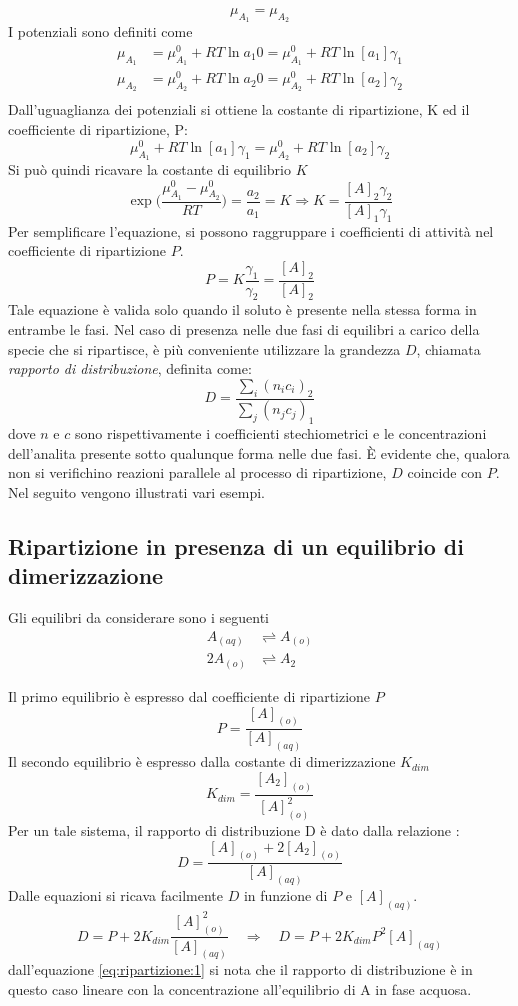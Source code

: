 \[
\mu_{A_{1}} = \mu_{A_{2}}
\]
I potenziali sono definiti come
\begin{align*}
\mu_{A_{1}} & = \mu_{A_{1}}^0 + RT \ln a_1 0 = \mu_{A_{1}}^0 + RT \ln [a_1]\gamma_1\\
\mu_{A_{2}} & = \mu_{A_{2}}^0 + RT \ln a_2 0 = \mu_{A_{2}}^0 + RT \ln [a_2]\gamma_2\\
\end{align*}
Dall'uguaglianza dei potenziali si ottiene la costante di ripartizione, K ed il coefficiente di ripartizione, P:
\[
\mu_{A_{1}}^0 + RT \ln [a_1]\gamma_1 = \mu_{A_{2}}^0 + RT \ln [a_2]\gamma_2
\]
Si può quindi ricavare la costante di equilibrio $K$
\[
\exp{\biggl(\frac{\mu_{A_{1}}^0 - \mu_{A_{2}}^0}{RT}\biggr)} = \frac{a_2}{a_1} = K \Rightarrow K = \frac{[A]_2 \gamma_2}{[A]_1 \gamma_1}
\]
Per semplificare l'equazione, si possono raggruppare i coefficienti di attività nel coefficiente di ripartizione $P$.
\[
P = K\frac{\gamma_1}{\gamma_2} = \frac{[A]_2}{[A]_2}
\]
Tale equazione è valida solo quando il soluto è presente nella stessa forma in entrambe le fasi. Nel caso di presenza nelle due fasi di equilibri a carico della specie che si ripartisce, è più conveniente utilizzare la grandezza $D$, chiamata \emph{rapporto di distribuzione}, definita come:
\[
D = \frac{\sum_i (n_i c_i)_2}{\sum_j (n_j c_j)_1}
\]
dove $n$ e $c$ sono rispettivamente i coefficienti stechiometrici e le concentrazioni dell'analita presente sotto qualunque forma nelle due fasi. È evidente che, qualora non si verifichino reazioni parallele al processo di ripartizione, $D$ coincide con $P$. Nel seguito vengono illustrati vari esempi.

\subsection{Ripartizione in presenza di un equilibrio di dimerizzazione}

Gli equilibri da considerare sono i seguenti
\begin{align*}
A_{(aq)} & \rightleftharpoons A_{(o)}\\
2 A_{(o)} & \rightleftharpoons A_2
\end{align*}

Il primo equilibrio è espresso dal coefficiente di ripartizione $P$
\[
P = \frac{[A]_{(o)}}{[A]_{(aq)}}
\]
Il secondo equilibrio è espresso dalla costante di dimerizzazione $K_{dim}$
\[
K_{dim} = \frac{[A_2]_{(o)}}{[A]_{(o)}^2}
\]
Per un tale sistema, il rapporto di distribuzione D è dato dalla relazione :
\[
D = \frac{[A]_{(o)} + 2 [A_2]_{(o)}}{[A]_{(aq)}}
\]
Dalle equazioni si ricava facilmente $D$ in funzione di $P$ e $[A]_{(aq)}$.
\begin{equation} \label{eq:ripartizione:1}
D = P + 2K_{dim} \frac{[A]_{(o)}^2}{[A]_{(aq)}} \quad \Rightarrow \quad D = P + 2K_{dim} P^2 [A]_{(aq)}
\end{equation}
dall'equazione \ref{eq:ripartizione:1} si nota che il rapporto di distribuzione è in questo caso lineare con la concentrazione all'equilibrio di A in fase acquosa.



